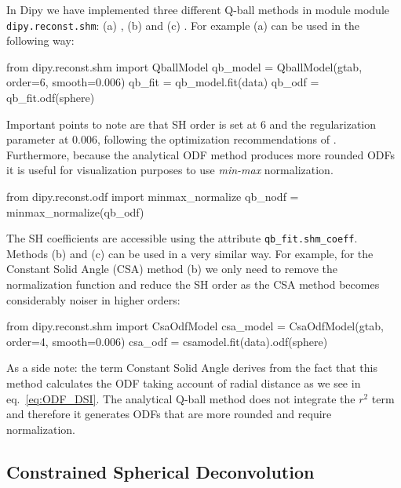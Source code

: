 \documentclass{bioinfo}
\begin{document}
In Dipy we have implemented three different Q-ball methods in module
module \texttt{dipy.reconst.shm}: (a)
\citet{descoteaux-angelino-etal:07}, (b) \citet{aganj-lenglet-etal:10}
and (c) \citet{tristan-vega-westin-etal:09}. For
example (a) can be used in the following way:
\begin{python}
from dipy.reconst.shm import QballModel
qb_model = QballModel(gtab, order=6, smooth=0.006)
qb_fit = qb_model.fit(data)
qb_odf = qb_fit.odf(sphere)
\end{python}
Important points to note are that SH order is set at $6$ and the regularization
parameter at $0.006$, following the optimization recommendations of
\citet{descoteaux-angelino-etal:06c}. Furthermore, because the
analytical ODF method produces more
rounded ODFs it is useful for visualization purposes to use \emph{min-max}
normalization.
\begin{python}
from dipy.reconst.odf import minmax_normalize
qb_nodf = minmax_normalize(qb_odf)
\end{python}
The SH coefficients are accessible using the attribute
\texttt{qb\_fit.shm\_coeff}. Methods (b) and (c) can be used in a very similar
way. For example, for the Constant Solid Angle (CSA)
\citep{aganj-lenglet-etal:10} method (b) we only need to remove the
normalization function and reduce the SH order as the CSA method becomes
considerably noiser in higher orders:
\begin{python}
from dipy.reconst.shm import CsaOdfModel
csa_model = CsaOdfModel(gtab, order=4,
                        smooth=0.006)
csa_odf = csamodel.fit(data).odf(sphere)
\end{python}
As a side note: the term Constant Solid Angle derives from the fact that this
method calculates the ODF taking account of radial distance as we see in
eq.~\ref{eq:ODF_DSI}. The analytical Q-ball method does not integrate the $r^2$
term and therefore it generates ODFs that are more rounded and require normalization.

\subsection{Constrained Spherical Deconvolution}
\end{document}
